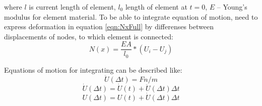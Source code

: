\documentclass[12pt]{report}
\begin{document}
where $l$ is current length of element, $l_0$ length of element at $t=0$, $E$ – Young’s modulus for element material.
To be able to integrate equation of motion, need to express deformation in equation \eqref{eqn:NxFull} by differenses 
between displacements of nodes, to which element is connected:
\begin{equation}\label{eqn:NxWdispl}
  N(x)=\frac{EA}{l_0}*(U_{i}-U_{j})
\end{equation}\par
Equations of motion for integrating can be described like:
\begin{equation}\label{eqn:Accel}
  \ddot{U}(\Delta t)=Fn/m
\end{equation}
\begin{equation}\label{eqn:Velos}
  \dot{U}(\Delta t)=\dot{U}(t)+\ddot{U}(\Delta t)\Delta t
\end{equation}
\begin{equation}\label{eqn:Displ}
  U(\Delta t)=U(t)+\dot{U}(\Delta t)\Delta t
\end{equation}
\end{document}
